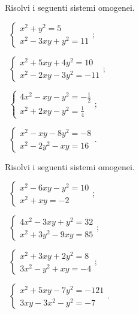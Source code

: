  \begin{esercizio}[\Ast]
\label{ese:6.41}
Risolvi i seguenti sistemi omogenei.
\begin{multicols}{2}
 \begin{enumeratea}
 \item~$\left\{\begin{array}{l}x^2+y^2=5\\x^2-3xy+y^2=11\end{array}\right.$;
 \item~$\left\{\begin{array}{l}x^2+5xy+4y^2=10\\x^2-2xy-3y^2=-11\end{array}\right.$;
 \item~$\left\{\begin{array}{l}4x^2-xy-y^2=-\frac 1 2\\x^2+2xy-y^2=\frac 1 4\end{array}\right.$;
 \item~$\left\{\begin{array}{l}x^2-xy-8y^2=-8\\x^2-2y^2-xy=16\end{array}\right.$.
 \end{enumeratea}
\end{multicols}
 \end{esercizio}

\begin{esercizio}
\label{ese:6.42}
Risolvi i seguenti sistemi omogenei.
\begin{multicols}{2}
 \begin{enumeratea}
 \item~$\left\{\begin{array}{l}x^2-6xy-y^2=10\\x^2+xy=-2\end{array}\right.$;
 \item~$\left\{\begin{array}{l}4x^2-3xy+y^2=32\\x^2+3y^2-9xy=85\end{array}\right.$;
 \item~$\left\{\begin{array}{l}x^2+3xy+2y^2=8\\3x^2-y^2+xy=-4\end{array}\right.$;
 \item~$\left\{\begin{array}{l}x^2+5xy-7y^2=-121\\3xy-3x^2-y^2=-7\end{array}\right.$.
 \end{enumeratea}
\end{multicols}
\end{esercizio}

